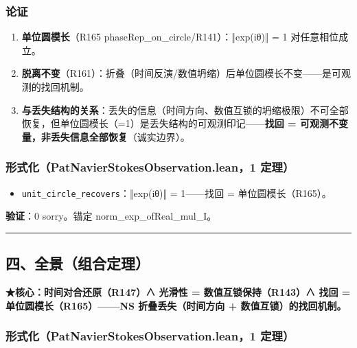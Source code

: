 \documentclass[
]{article}
\providecommand{\tightlist}{%
 \setlength{\itemsep}{0pt}\setlength{\parskip}{0pt}}
\begin{document}
\subsubsection{论证}\label{ux8bbaux8bc1-2}

\begin{enumerate}
\def\labelenumi{\arabic{enumi}.}
\tightlist
\item
 \textbf{单位圆模长}（R165 phaseRep\_on\_circle/R141）：‖exp(iθ)‖ = 1
 对任意相位成立。
\item
 \textbf{脱离不变}（R161）：折叠（时间反演/数值坍缩）后单位圆模长不变------是可观测的找回机制。
\item
 \textbf{与丢失结构的关系}：丢失的信息（时间方向、数值互锁的坍缩极限）不可全部恢复，但单位圆模长（=1）是丢失结构的可观测印记------\textbf{找回
 = 可观测不变量，非丢失信息全部恢复}（诚实边界）。
\end{enumerate}

\subsubsection{形式化（PatNavierStokesObservation.lean，1
定理）}\label{ux5f62ux5f0fux5316patnavierstokesobservation.lean1-ux5b9aux7406-1}

\begin{itemize}
\tightlist
\item
 \texttt{unit\_circle\_recovers}：‖exp(iθ)‖ = 1------找回 =
 单位圆模长（R165）。
\end{itemize}

\textbf{验证}：0 sorry。锚定 norm\_exp\_ofReal\_mul\_I。

\begin{center}\rule{0.5\linewidth}{0.5pt}\end{center}

\subsection{四、全景（组合定理）}\label{ux56dbux5168ux666fux7ec4ux5408ux5b9aux7406}

\textbf{★核心：时间对合还原（R147）∧ 光滑性 = 数值互锁保持（R143）∧ 找回
= 单位圆模长（R165）------NS 折叠丢失（时间方向 +
数值互锁）的找回机制。}

\subsubsection{形式化（PatNavierStokesObservation.lean，1
定理）}\label{ux5f62ux5f0fux5316patnavierstokesobservation.lean1-ux5b9aux7406-2}
\end{document}
